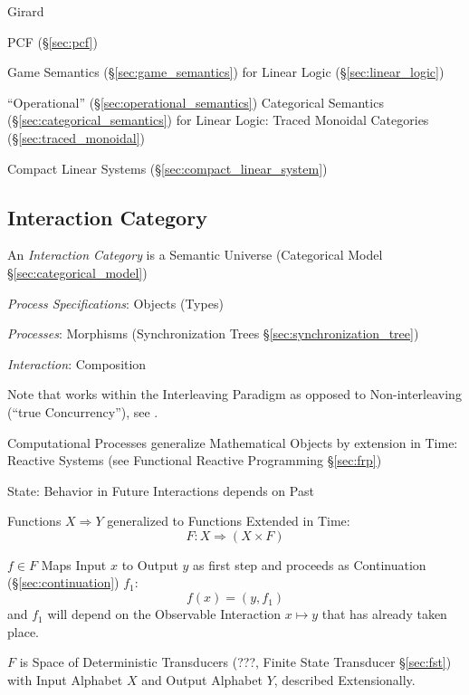 Girard

PCF (\S\ref{sec:pcf})

Game Semantics (\S\ref{sec:game_semantics}) for Linear Logic
(\S\ref{sec:linear_logic})

``Operational'' (\S\ref{sec:operational_semantics}) Categorical
Semantics (\S\ref{sec:categorical_semantics}) for Linear Logic: Traced
Monoidal Categories (\S\ref{sec:traced_monoidal})

Compact Linear Systems (\S\ref{sec:compact_linear_system})

\cite{abramsky-gay-nagarajan96}



\subsection{Interaction Category}\label{sec:interaction_category}
\cite{abramsky-gay-nagarajan96}

An \emph{Interaction Category} is a Semantic Universe (Categorical
Model \S\ref{sec:categorical_model})

\emph{Process Specifications}: Objects (Types)

\emph{Processes}: Morphisms (Synchronization Trees
\S\ref{sec:synchronization_tree})

\emph{Interaction}: Composition

\fist Note that \cite{abramsky-gay-nagarajan96} works within the
Interleaving Paradigm as opposed to Non-interleaving (``true
Concurrency''), see \cite{winskel-nielsen93}.

Computational Processes generalize Mathematical Objects by extension
in Time: Reactive Systems (see Functional Reactive Programming
\S\ref{sec:frp})

State: Behavior in Future Interactions depends on Past

Functions $X \Rightarrow Y$ generalized to Functions Extended in Time:
\[
  F : X \Rightarrow (X \times F)
\]

$f \in F$ Maps Input $x$ to Output $y$ as first step and proceeds as
Continuation (\S\ref{sec:continuation}) $f_1$:
\[
  f(x) = (y,f_1)
\]
and $f_1$ will depend on the Observable Interaction $x \mapsto y$ that
has already taken place.

$F$ is Space of Deterministic Transducers (???, Finite State
Transducer \S\ref{sec:fst}) with Input Alphabet $X$ and Output
Alphabet $Y$, described Extensionally.

